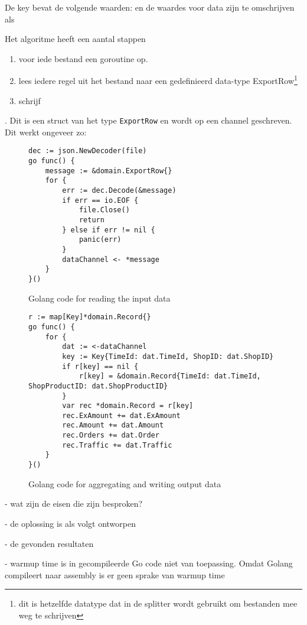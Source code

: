 De key bevat de volgende waarden:  en de waardes voor data zijn te omschrijven als



Het algoritme heeft een aantal stappen

\begin{enumerate}
\item voor iede bestand een goroutine op. 
\item lees iedere regel uit het bestand naar een gedefinieerd data-type ExportRow\footnote{dit is hetzelfde datatype dat in de splitter wordt gebruikt om bestanden mee weg te schrijven}
\item schrijf 
\end{enumerate}
    
. Dit is een struct van het type \verb+ExportRow+ en wordt op een channel geschreven. Dit werkt ongeveer zo:

\clearpage

\begin{figure}[h]
\caption{Golang code for reading the input data }
\begin{lstlisting}[language=Golang]
dec := json.NewDecoder(file)
go func() {
    message := &domain.ExportRow{}
    for {
        err := dec.Decode(&message)
        if err == io.EOF {
            file.Close()
            return
        } else if err != nil {
            panic(err)
        }
        dataChannel <- *message
    }
}()
\end{lstlisting}
\end{figure}

\begin{figure}[!h]
\caption{Golang code for aggregating and writing output data }
\begin{lstlisting}
r := map[Key]*domain.Record{}
go func() {
	for {
		dat := <-dataChannel
		key := Key{TimeId: dat.TimeId, ShopID: dat.ShopID}
		if r[key] == nil {
			r[key] = &domain.Record{TimeId: dat.TimeId, ShopProductID: dat.ShopProductID}
		}
		var rec *domain.Record = r[key]
		rec.ExAmount += dat.ExAmount
		rec.Amount += dat.Amount
		rec.Orders += dat.Order
		rec.Traffic += dat.Traffic
	}
}()
\end{lstlisting}
\end{figure}


- wat zijn de eisen die zijn besproken?

- de oplossing is als volgt ontworpen

- de gevonden resultaten

- warmup time is in gecompileerde Go code niet van toepassing.
Omdat Golang compileert naar assembly is er geen sprake van warmup time


